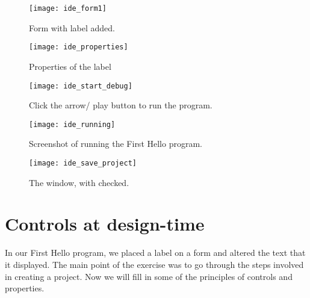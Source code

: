 		\begin{figure}[ht]
			\centering
			\texttt{[image: ide\_form1]}
			\caption{Form with label added.}
			\label{fig:ide_form1}
		\end{figure}

		\begin{figure}[ht]
			\centering
			\texttt{[image: ide\_properties]}
			\caption{Properties of the label}
			\label{fig:ide_properties}
		\end{figure}
		\begin{figure}[ht]
			\centering
			\texttt{[image: ide\_start\_debug]}
			\caption{Click the arrow/ play button to run the program.}
			\label{fig:ide_start_debug}
		\end{figure}

		\begin{figure}[ht]
			\centering
			\texttt{[image: ide\_running]}
			\caption{Screenshot of running the First Hello program.}
			\label{fig:ide_running}
		\end{figure}

		\begin{figure}[ht]
			\centering
			\texttt{[image: ide\_save\_project]}
			\caption{The  window, with  checked.}
			\label{fig:ide_save_project}
		\end{figure}


	\section{Controls at design-time}
		In our First Hello program, we placed a label on a form and altered the text that it displayed. The main point of the exercise was to go through the steps involved in creating a project. Now we will fill in some of the principles of controls and properties.


